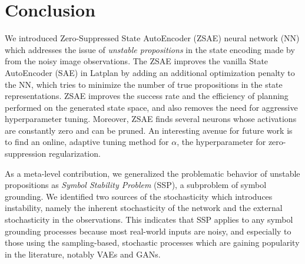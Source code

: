 \section{Conclusion}
\label{conclusion}

We introduced Zero-Suppressed State AutoEncoder (ZSAE) neural network (NN) which addresses
the issue of \emph{unstable propositions} in the state encoding made by
\latentplanner \cite{Asai2018} from the noisy image observations.
% 
The ZSAE improves the vanilla State AutoEncoder (SAE) in Latplan by
adding an additional optimization penalty to the NN,
which tries to minimize the number of true propositions in the state representations.
% 
ZSAE improves the success rate and the efficiency of planning performed on
the generated state space, and also removes the need for aggressive hyperparameter tuning.
% 
Moreover, 
ZSAE finds several neurons whose activations are constantly zero
and can be pruned.
An interesting avenue for future work is to 
find an online, adaptive tuning method for $\alpha$, the hyperparameter for
zero-suppression regularization.

As a meta-level contribution,
we generalized the problematic behavior of unstable propositions
as \emph{Symbol Stability Problem} (SSP), a subproblem of symbol grounding.
% 
We identified two sources of the stochasticity which introduces instability,
namely
the inherent stochasticity of the network and
the external stochasticity in the observations.
% 
This indicates that
SSP applies to any symbol grounding processes because most real-world inputs are noisy,
and especially to those using the sampling-based, stochastic processes
which are gaining popularity in the literature, notably VAEs and GANs.


